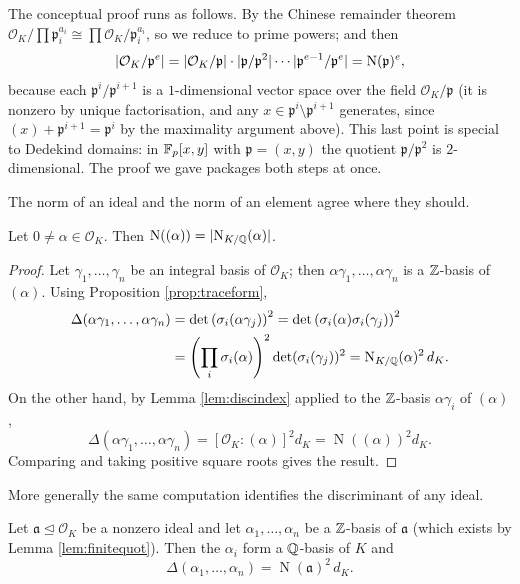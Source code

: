 \documentclass[a4paper]{scrartcl}
\renewcommand{\OO}{\mathcal{O}}
\newcommand{\Nm}{\operatorname{N}}
\newcommand{\fa}{\mathfrak{a}}
\newcommand{\fp}{\mathfrak{p}}
\begin{document}
\begin{remark}
	The conceptual proof runs as follows. By the Chinese remainder theorem $\OO_K/\prod\fp_i^{a_i} \cong \prod \OO_K/\fp_i^{a_i}$, so we reduce to prime powers; and then
	$$\abs{\OO_K/\fp^e} = \abs{\OO_K/\fp}\cdot\abs{\fp/\fp^2}\cdots\abs{\fp^{e-1}/\fp^e} = \Nm(\fp)^e,$$
	because each $\fp^i/\fp^{i+1}$ is a $1$-dimensional vector space over the field $\OO_K/\fp$ (it is nonzero by unique factorisation, and any $x \in \fp^i \setminus \fp^{i+1}$ generates, since $(x)+\fp^{i+1} = \fp^i$ by the maximality argument above). This last point is special to Dedekind domains: in $\mathbb{F}_p[x,y]$ with $\fp = (x,y)$ the quotient $\fp/\fp^2$ is $2$-dimensional. The proof we gave packages both steps at once.
\end{remark}

The norm of an ideal and the norm of an element agree where they should.

\begin{lemma}\label{lem:normprincipal}
	Let $0 \neq \alpha \in \OO_K$. Then $\Nm((\alpha)) = \abs{\Nm_{K/\Q}(\alpha)}$.
\end{lemma}

\begin{proof}
	Let $\gamma_1, \dots, \gamma_n$ be an integral basis of $\OO_K$; then $\alpha\gamma_1, \dots, \alpha\gamma_n$ is a $\mathbb{Z}$-basis of $(\alpha)$. Using Proposition \ref{prop:traceform},
	\begin{align*}
		\Delta(\alpha\gamma_1,\dots,\alpha\gamma_n) &= \det\left(\sigma_i(\alpha\gamma_j)\right)^2 = \det\left(\sigma_i(\alpha)\sigma_i(\gamma_j)\right)^2\\
		&= \left(\prod_i\sigma_i(\alpha)\right)^2\det(\sigma_i(\gamma_j))^2 = \Nm_{K/\Q}(\alpha)^2\, d_K.
	\end{align*}
	On the other hand, by Lemma \ref{lem:discindex} applied to the $\mathbb{Z}$-basis $\alpha\gamma_i$ of $(\alpha)$,
	$$\Delta(\alpha\gamma_1,\dots,\alpha\gamma_n) = [\OO_K : (\alpha)]^2 d_K = \Nm((\alpha))^2 d_K.$$
	Comparing and taking positive square roots gives the result.
\end{proof}

More generally the same computation identifies the discriminant of any ideal.

\begin{lemma}\label{lem:idealdisc}
	Let $\fa \trianglelefteq \OO_K$ be a nonzero ideal and let $\alpha_1, \dots, \alpha_n$ be a $\mathbb{Z}$-basis of $\fa$ (which exists by Lemma \ref{lem:finitequot}). Then the $\alpha_i$ form a $\mathbb{Q}$-basis of $K$ and
	$$\Delta(\alpha_1, \dots, \alpha_n) = \Nm(\fa)^2\, d_K.$$
\end{lemma}
\end{document}
